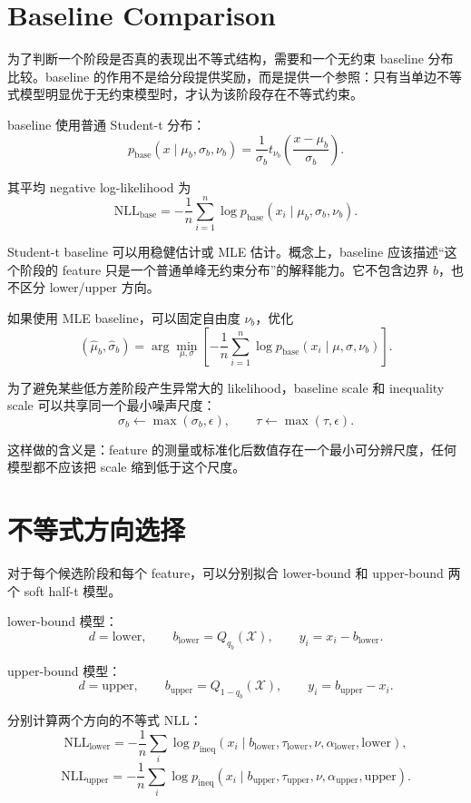 \documentclass[11pt]{ctexart}
\begin{document}
\section{Baseline Comparison}

为了判断一个阶段是否真的表现出不等式结构，需要和一个无约束 baseline 分布比较。baseline 的作用不是给分段提供奖励，而是提供一个参照：只有当单边不等式模型明显优于无约束模型时，才认为该阶段存在不等式约束。

baseline 使用普通 Student-t 分布：
\[
 p_{\mathrm{base}}(x\mid \mu_b,\sigma_b,\nu_b)
 =
 \frac{1}{\sigma_b}
 t_{\nu_b}\!\left(\frac{x-\mu_b}{\sigma_b}\right).
\]

其平均 negative log-likelihood 为
\[
 \mathrm{NLL}_{\mathrm{base}}
 =
 -\frac{1}{n}\sum_{i=1}^n
 \log p_{\mathrm{base}}(x_i\mid \mu_b,\sigma_b,\nu_b).
\]

Student-t baseline 可以用稳健估计或 MLE 估计。概念上，baseline 应该描述“这个阶段的 feature 只是一个普通单峰无约束分布”的解释能力。它不包含边界 $b$，也不区分 lower/upper 方向。

如果使用 MLE baseline，可以固定自由度 $\nu_b$，优化
\[
 (\hat\mu_b,\hat\sigma_b)
 =
 \arg\min_{\mu,\sigma}
 \left[-\frac{1}{n}\sum_{i=1}^n
 \log p_{\mathrm{base}}(x_i\mid \mu,\sigma,\nu_b)\right].
\]

为了避免某些低方差阶段产生异常大的 likelihood，baseline scale 和 inequality scale 可以共享同一个最小噪声尺度：
\[
 \sigma_b \leftarrow \max(\sigma_b,\epsilon),
 \qquad
 \tau \leftarrow \max(\tau,
 \epsilon).
\]

这样做的含义是：feature 的测量或标准化后数值存在一个最小可分辨尺度，任何模型都不应该把 scale 缩到低于这个尺度。

\section{不等式方向选择}

对于每个候选阶段和每个 feature，可以分别拟合 lower-bound 和 upper-bound 两个 soft half-t 模型。

lower-bound 模型：
\[
 d=\mathrm{lower},
 \qquad
 b_{\mathrm{lower}}=Q_{q_b}(\mathcal{X}),
 \qquad
 y_i=x_i-b_{\mathrm{lower}}.
\]

upper-bound 模型：
\[
 d=\mathrm{upper},
 \qquad
 b_{\mathrm{upper}}=Q_{1-q_b}(\mathcal{X}),
 \qquad
 y_i=b_{\mathrm{upper}}-x_i.
\]

分别计算两个方向的不等式 NLL：
\[
 \mathrm{NLL}_{\mathrm{lower}}
 =
 -\frac{1}{n}\sum_i
 \log p_{\mathrm{ineq}}(x_i\mid b_{\mathrm{lower}},\tau_{\mathrm{lower}},\nu,\alpha_{\mathrm{lower}},\mathrm{lower}),
\]
\[
 \mathrm{NLL}_{\mathrm{upper}}
 =
 -\frac{1}{n}\sum_i
 \log p_{\mathrm{ineq}}(x_i\mid b_{\mathrm{upper}},\tau_{\mathrm{upper}},\nu,\alpha_{\mathrm{upper}},\mathrm{upper}).
\]
\end{document}
